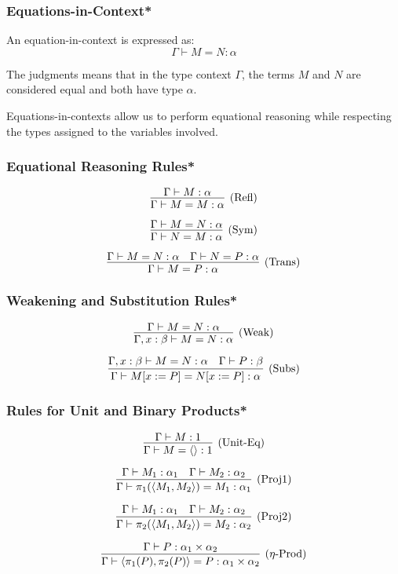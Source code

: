 \documentclass[aspectratio=169]{beamer}
\begin{document}
\begin{frame}
\frametitle{Equations-in-Context*}

An equation-in-context is expressed as:
\[
\Gamma \vdash M = N : \alpha
\]

The judgments means that in the type context $\Gamma$, the terms $M$ and $N$ are considered equal and both have type $\alpha$.

\medskip

Equations-in-contexts allow us to perform equational reasoning while respecting the types assigned to the variables involved.
\end{frame}

\begin{frame}
\frametitle{Equational Reasoning Rules*}

\[
\infer[\text{(Refl)}]{\Gamma \vdash M = M : \alpha}{\Gamma \vdash M : \alpha}
\]

\[
\infer[\text{(Sym)}]{\Gamma \vdash N = M : \alpha}{\Gamma \vdash M = N : \alpha}
\]

\[
\infer[\text{(Trans)}]{\Gamma \vdash M = P : \alpha}{\Gamma \vdash M = N : \alpha & \Gamma \vdash N = P : \alpha}
\]
\end{frame}

\begin{frame}
\frametitle{Weakening and Substitution Rules*}

\[
\infer[\text{(Weak)}]{\Gamma, x : \beta \vdash M = N : \alpha}{\Gamma \vdash M = N : \alpha}
\]

\[
\infer[\text{(Subs)}]{\Gamma \vdash M[x := P] = N[x := P] : \alpha}{\Gamma, x : \beta \vdash M = N : \alpha & \Gamma \vdash P : \beta}
\]
\end{frame}

\begin{frame}
\frametitle{Rules for Unit and Binary Products*}

\[
\infer[\text{(Unit-Eq)}]{\Gamma \vdash M = \langle\rangle : 1}{\Gamma \vdash M : 1}
\]

\[
\infer[\text{(Proj1)}]{\Gamma \vdash \pi_1(\langle M_1, M_2 \rangle) = M_1 : \alpha_1}{\Gamma \vdash M_1 : \alpha_1 & \Gamma \vdash M_2 : \alpha_2}
\]

\[
\infer[\text{(Proj2)}]{\Gamma \vdash \pi_2(\langle M_1, M_2 \rangle) = M_2 : \alpha_2}{\Gamma \vdash M_1 : \alpha_1 & \Gamma \vdash M_2 : \alpha_2}
\]

\[
\infer[\text{($\eta$-Prod)}]{\Gamma \vdash \langle \pi_1(P), \pi_2(P) \rangle = P : \alpha_1 \times \alpha_2}{\Gamma \vdash P : \alpha_1 \times \alpha_2}
\]
\end{frame}
\end{document}
